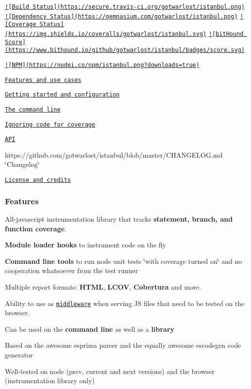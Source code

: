 \href{http://travis-ci.org/gotwarlost/istanbul}{\tt !\mbox{[}Build Status\mbox{]}(https\+://secure.\+travis-\/ci.\+org/gotwarlost/istanbul.\+png)} \href{https://gemnasium.com/gotwarlost/istanbul}{\tt !\mbox{[}Dependency Status\mbox{]}(https\+://gemnasium.\+com/gotwarlost/istanbul.\+png)} \href{https://coveralls.io/r/gotwarlost/istanbul?branch=master}{\tt !\mbox{[}Coverage Status\mbox{]}(https\+://img.\+shields.\+io/coveralls/gotwarlost/istanbul.\+svg)} \href{https://www.bithound.io/github/gotwarlost/istanbul}{\tt !\mbox{[}bit\+Hound Score\mbox{]}(https\+://www.\+bithound.\+io/github/gotwarlost/istanbul/badges/score.\+svg)}

\href{https://nodei.co/npm/istanbul/}{\tt !\mbox{[}N\+P\+M\mbox{]}(https\+://nodei.\+co/npm/istanbul.\+png?downloads=true)}


\begin{DoxyItemize}
\item \href{#features}{\tt Features and use cases}
\item \href{#getting-started}{\tt Getting started and configuration}
\item \href{#the-command-line}{\tt The command line}
\item \href{#ignoring-code-for-coverage}{\tt Ignoring code for coverage}
\item \href{#api}{\tt A\+P\+I}
\item https\+://github.com/gotwarlost/istanbul/blob/master/\+C\+H\+A\+N\+G\+E\+L\+O\+G.\+md \char`\"{}\+Changelog\char`\"{}
\item \href{#license}{\tt License and credits}
\end{DoxyItemize}

\subsubsection*{Features}


\begin{DoxyItemize}
\item All-\/javascript instrumentation library that tracks {\bfseries statement, branch, and function coverage}.
\item {\bfseries Module loader hooks} to instrument code on the fly
\item {\bfseries Command line tools} to run node unit tests \char`\"{}with coverage turned on\char`\"{} and no cooperation whatsoever from the test runner
\item Multiple report formats\+: {\bfseries H\+T\+M\+L}, {\bfseries L\+C\+O\+V}, {\bfseries Cobertura} and more.
\item Ability to use as \href{https://github.com/gotwarlost/istanbul-middleware}{\tt middleware} when serving J\+S files that need to be tested on the browser.
\item Can be used on the {\bfseries command line} as well as a {\bfseries library}
\item Based on the awesome {\ttfamily esprima} parser and the equally awesome {\ttfamily escodegen} code generator
\item Well-\/tested on node (prev, current and next versions) and the browser (instrumentation library only)
\end{DoxyItemize}

